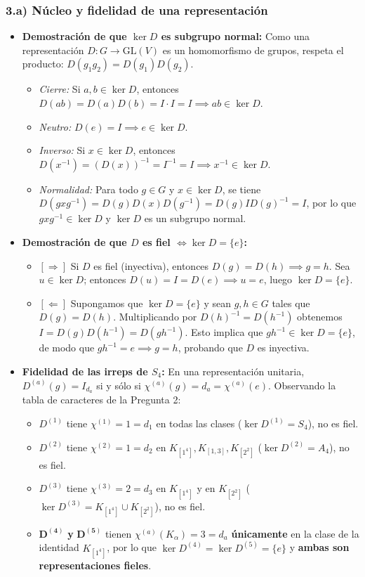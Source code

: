 \documentclass[11pt, a4paper]{article}
\begin{document}
\subsubsection*{3.a) Núcleo y fidelidad de una representación}
\begin{itemize}
    \item \textbf{Demostración de que $\ker D$ es subgrupo normal:}
    Como una representación $D : G \to \text{GL}(V)$ es un homomorfismo de grupos, respeta el producto: $D(g_1 g_2) = D(g_1) D(g_2)$.
    \begin{itemize}
        \item \textit{Cierre:} Si $a, b \in \ker D$, entonces $D(ab) = D(a)D(b) = I \cdot I = I \implies ab \in \ker D$.
        \item \textit{Neutro:} $D(e) = I \implies e \in \ker D$.
        \item \textit{Inverso:} Si $x \in \ker D$, entonces $D(x^{-1}) = (D(x))^{-1} = I^{-1} = I \implies x^{-1} \in \ker D$.
        \item \textit{Normalidad:} Para todo $g \in G$ y $x \in \ker D$, se tiene $D(gxg^{-1}) = D(g)D(x)D(g^{-1}) = D(g) I D(g)^{-1} = I$, por lo que $gxg^{-1} \in \ker D$ y $\ker D$ es un subgrupo normal.
    \end{itemize}
    \item \textbf{Demostración de que $D$ es fiel $\iff \ker D = \{e\}$:}
    \begin{itemize}
        \item $[\Rightarrow]$ Si $D$ es fiel (inyectiva), entonces $D(g) = D(h) \implies g = h$. Sea $u \in \ker D$; entonces $D(u) = I = D(e) \implies u = e$, luego $\ker D = \{e\}$.
        \item $[\Leftarrow]$ Supongamos que $\ker D = \{e\}$ y sean $g, h \in G$ tales que $D(g) = D(h)$. Multiplicando por $D(h)^{-1} = D(h^{-1})$ obtenemos $I = D(g)D(h^{-1}) = D(gh^{-1})$. Esto implica que $gh^{-1} \in \ker D = \{e\}$, de modo que $gh^{-1} = e \implies g = h$, probando que $D$ es inyectiva.
    \end{itemize}
    \item \textbf{Fidelidad de las irreps de $S_4$:}
    En una representación unitaria, $D^{(a)}(g) = I_{d_a}$ si y sólo si $\chi^{(a)}(g) = d_a = \chi^{(a)}(e)$. Observando la tabla de caracteres de la Pregunta 2:
    \begin{itemize}
        \item $D^{(1)}$ tiene $\chi^{(1)} = 1 = d_1$ en todas las clases ($\ker D^{(1)} = S_4$), no es fiel.
        \item $D^{(2)}$ tiene $\chi^{(2)} = 1 = d_2$ en $K_{[1^4]}, K_{[1,3]}, K_{[2^2]}$ ($\ker D^{(2)} = A_4$), no es fiel.
        \item $D^{(3)}$ tiene $\chi^{(3)} = 2 = d_3$ en $K_{[1^4]}$ y en $K_{[2^2]}$ ($\ker D^{(3)} = K_{[1^4]} \cup K_{[2^2]}$), no es fiel.
        \item $\mathbf{D^{(4)}}$ \textbf{y} $\mathbf{D^{(5)}}$ tienen $\chi^{(a)}(K_\alpha) = 3 = d_a$ \textbf{únicamente} en la clase de la identidad $K_{[1^4]}$, por lo que $\ker D^{(4)} = \ker D^{(5)} = \{e\}$ y \textbf{ambas son representaciones fieles}.
    \end{itemize}
\end{itemize}
\end{document}
